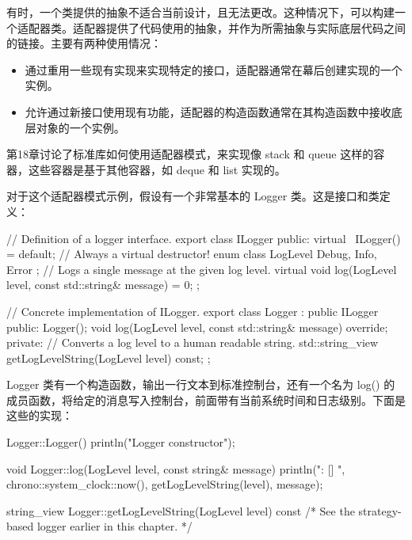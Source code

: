 有时，一个类提供的抽象不适合当前设计，且无法更改。这种情况下，可以构建一个适配器类。适配器提供了代码使用的抽象，并作为所需抽象与实际底层代码之间的链接。主要有两种使用情况：

\begin{itemize}
\item
通过重用一些现有实现来实现特定的接口，适配器通常在幕后创建实现的一个实例。

\item
允许通过新接口使用现有功能，适配器的构造函数通常在其构造函数中接收底层对象的一个实例。
\end{itemize}

第18章讨论了标准库如何使用适配器模式，来实现像 stack 和 queue 这样的容器，这些容器是基于其他容器，如 deque 和 list 实现的。


对于这个适配器模式示例，假设有一个非常基本的 Logger 类。这是接口和类定义：

\begin{cpp}
// Definition of a logger interface.
export class ILogger
{
    public:
        virtual ~ILogger() = default; // Always a virtual destructor!
        enum class LogLevel { Debug, Info, Error };
        // Logs a single message at the given log level.
        virtual void log(LogLevel level, const std::string& message) = 0;
};

// Concrete implementation of ILogger.
export class Logger : public ILogger
{
    public:
        Logger();
        void log(LogLevel level, const std::string& message) override;
    private:
        // Converts a log level to a human readable string.
        std::string_view getLogLevelString(LogLevel level) const;
};
\end{cpp}

Logger 类有一个构造函数，输出一行文本到标准控制台，还有一个名为 log() 的成员函数，将给定的消息写入控制台，前面带有当前系统时间和日志级别。下面是这些的实现：

\begin{cpp}
Logger::Logger() { println("Logger constructor"); }

void Logger::log(LogLevel level, const string& message)
{
    println("{}: [{}] {}", chrono::system_clock::now(),
    getLogLevelString(level), message);
}

string_view Logger::getLogLevelString(LogLevel level) const
{ /* See the strategy-based logger earlier in this chapter. */ }
\end{cpp}


